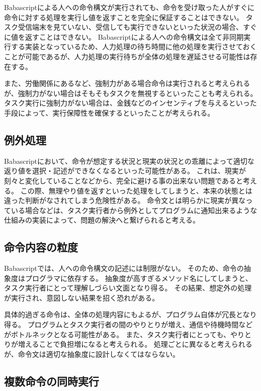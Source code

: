 \documentclass[twoside]{wiss}
\begin{document}
Babascriptによる人への命令構文が実行されても、命令を受け取った人がすぐに命令に対する処理を実行し値を返すことを完全に保証することはできない。
タスク受信端末を見ていない、受信しても実行できないといった状況の場合、すぐに値を返すことはできない。
Babascriptによる人への命令構文は全て非同期実行する実装となっているため、人力処理の待ち時間に他の処理を実行させておくことが可能であるが、人力処理の実行待ちが全体の処理を遅延させる可能性は存在する。

また、労働関係にあるなど、強制力がある場合命令は実行されると考えられるが、強制力がない場合はそもそもタスクを無視するといったことも考えられる。
タスク実行に強制力がない場合は、金銭などのインセンティブを与えるといった手段によって、実行保障性を確保するといったことが考えられる。

\subsection{例外処理}

Babascriptにおいて、命令が想定する状況と現実の状況との乖離によって適切な返り値を選択・記述ができなくなるといった可能性がある。
これは、現実が刻々と変化していることなどから、完全に避ける事の出来ない問題であると考える。
この際、無理やり値を返すといった処理をしてしまうと、本来の状態とは違った判断がなされてしまう危険性がある。
命令文とは明らかに現実が異なっている場合などは、タスク実行者から例外としてプログラムに通知出来るような仕組みの実装によって、問題の解決へと繋げられると考える。

\subsection{命令内容の粒度}

Babascriptでは、人への命令構文の記述には制限がない。
そのため、命令の抽象度はプログラマに依存する。
抽象度が高すぎるメソッド名にしてしまうと、タスク実行者にとって理解しづらい文面となり得る。
その結果、想定外の処理が実行され、意図しない結果を招く恐れがある。

具体的過ぎる命令は、全体の処理内容にもよるが、プログラム自体が冗長となり得る。
プログラムとタスク実行者の間のやりとりが増え、通信や待機時間などがボトルネックとなる可能性がある。
また、タスク実行者にとっても、やりとりが増えることで負担増になると考えられる。
処理ごとに異なると考えられるが、命令文は適切な抽象度に設計しなくてはならない。


\subsection{複数命令の同時実行}
\end{document}

